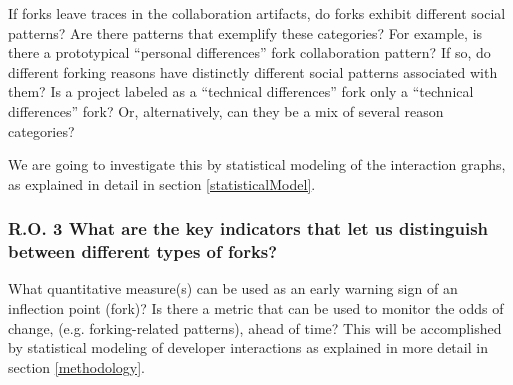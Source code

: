 \documentclass{report}
\begin{document}
If forks leave traces in the collaboration artifacts, do forks exhibit different social patterns? Are there patterns that exemplify these categories? For example, is there a prototypical ``personal differences'' fork collaboration pattern? If so, do different forking reasons have distinctly different social patterns associated with them? Is a project labeled as a ``technical differences'' fork only a ``technical differences'' fork? Or, alternatively, can they be a mix of several reason categories?

We are going to investigate this by statistical modeling of the interaction graphs, as explained in detail in section \ref{statisticalModel}.

\subsubsection*{R.O. 3 \hspace{4 mm} What are the key indicators that let us distinguish between different types of forks?\\}

What quantitative measure(s) can be used as an early warning sign of an inflection point (fork)? Is there a metric that can be used to monitor the odds of change, (e.g. forking-related patterns), ahead of time? This will be accomplished by statistical modeling of developer interactions as explained in more detail in section \ref{methodology}.

%
%

\end{document}
